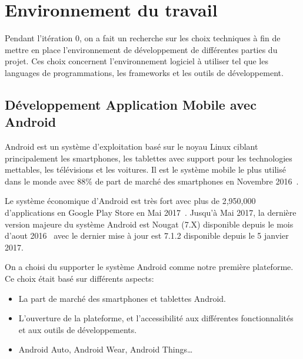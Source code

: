 \section{Environnement du travail}

Pendant l'itération 0, on a fait un recherche sur les choix techniques à fin de
mettre en place l'environnement de développement de différentes parties du
projet. Ces choix concernent l'environnement logiciel à utiliser tel que les
languages de programmations, les frameworks et les outils de développement.


\subsection{Développement Application Mobile avec Android}

Android est un système d'exploitation basé sur le noyau Linux ciblant
principalement les smartphones, les tablettes avec support pour les
technologies mettables, les télévisions et les voitures. Il est le système
mobile le plus utilisé dans le monde avec 88\% de part de marché des
smartphones en Novembre 2016~\cite{android-market-share}.

Le système économique d'Android est très fort avec plus de 2,950,000
d'applications en Google Play Store en Mai 2017~\cite{android-apps}. Jusqu'à
Mai 2017, la dernière version majeure du système Android est Nougat (7.X)
disponible depuis le mois d'aout 2016~\cite{android-7-release} avec le dernier
mise à jour est 7.1.2 disponible depuis le 5 janvier 2017.

On a choisi du supporter le système Android comme notre première plateforme. Ce
choix était basé sur différents aspects:

\begin{itemize}
    \item La part de marché des smartphones et tablettes Android.
    \item L'ouverture de la plateforme, et l'accessibilité aux différentes
        fonctionnalités et aux outils de développements.
    \item Android Auto, Android Wear, Android Things\ldots
\end{itemize}

